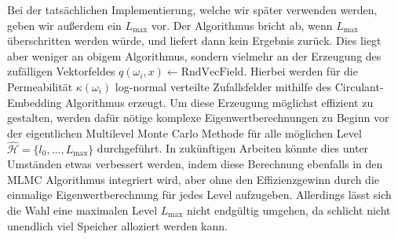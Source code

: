 Bei der tatsächlichen Implementierung, welche wir später verwenden werden, geben wir außerdem ein $ L_{\max} $ vor. Der Algorithmus bricht ab, wenn $ L_{\max} $ überschritten werden würde, und liefert dann kein Ergebnis zurück.
Dies liegt aber weniger an obigem Algorithmus, sondern vielmehr an der Erzeugung des zufälligen Vektorfeldes $ q(\omega_i,x) \leftarrow \text{RndVecField} $. Hierbei werden für die Permeabilität $ \kappa(\omega_i) $ log-normal verteilte Zufallsfelder mithilfe des Circulant-Embedding Algorithmus erzeugt. Um diese Erzeugung möglichst effizient zu gestalten, werden dafür nötige komplexe Eigenwertberechnungen zu Beginn vor der eigentlichen Multilevel Monte Carlo Methode für alle möglichen Level $ \widehat{\mathcal{H}} = \{ l_0,\dots,L_{\max}\}$ durchgeführt.
In zukünftigen Arbeiten könnte dies unter Umständen etwas verbessert werden, indem diese Berechnung ebenfalls in den MLMC Algorithmus integriert wird, aber ohne den Effizienzgewinn durch die einmalige Eigenwertberechnung für jedes Level aufzugeben. Allerdings lässt sich die Wahl eine maximalen Level $ L_{\max} $ nicht endgültig umgehen, da schlicht nicht unendlich viel Speicher alloziert werden kann.
 
 
 
%

